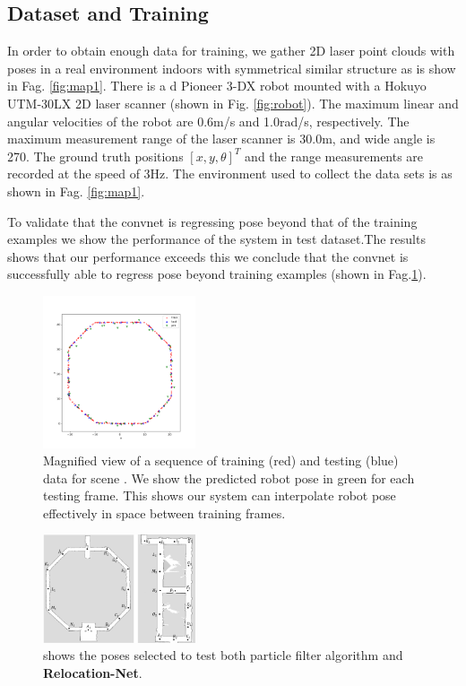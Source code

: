\documentclass[journal]{IEEEtran}
\begin{document}
\subsection{Dataset and Training}

In order to obtain enough data for training, we gather 2D laser point clouds with poses in a real environment indoors with symmetrical similar structure as is show in Fag. \ref{fig:map1}. There is a d Pioneer 3-DX robot mounted with a Hokuyo UTM-30LX 2D laser scanner (shown in Fig. \ref{fig:robot}). The maximum linear and angular velocities of the robot are 0.6m/s and 1.0rad/s, respectively. The maximum measurement range of the laser scanner is 30.0m, and wide angle is 270. The ground truth positions $ [x, y, \theta] ^T$ and the range measurements are recorded at the speed of 3Hz. The environment used to collect the data sets is as shown in Fag. \ref{fig:map1}.

To validate that the convnet is regressing pose beyond that of the training examples we show the performance of the system in test dataset.The results shows that  our performance exceeds this we conclude that the convnet is successfully able to regress pose beyond training examples (shown in Fag.\ref{fig:point}).


\begin{figure}[H]
	\centering
	\includegraphics[width=0.4\textwidth]{point.pdf}
	\caption{Magnified view of a sequence of training (red) and testing (blue) data for scene \uppercase\expandafter{}. We show the predicted robot pose in green for each testing frame. This shows our system can interpolate robot pose effectively in space between training frames.} \label{fig:point}
\end{figure}


\begin{figure}[H]
	\centering
	\includegraphics[width=0.4\textwidth]{testpoint1.png}
	\caption{ shows the  poses selected to test both particle filter algorithm and \textbf{Relocation-Net}.} \label{fig:testpoint1}
\end{figure}
\end{document}
